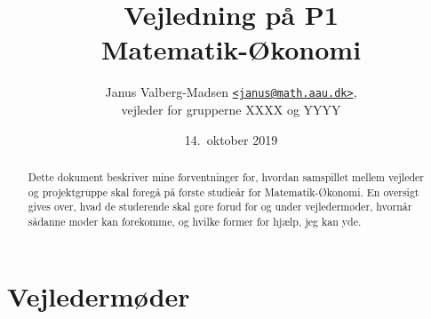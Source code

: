 \documentclass[12pt,a4paper,oneside,final]{article}
\title{
  Vejledning på P1\\
  Matematik-{\O}konomi
}
\author{
  Janus Valberg-Madsen \href{mailto:janus@math.aau.dk}{\texttt{<janus@math.aau.dk>}},\\
  vejleder for grupperne XXXX og YYYY
}
\date{14.\ oktober 2019}
\begin{document}
\maketitle

\renewcommand{\abstractname}{Om dette dokument}
\begin{abstract}
  Dette dokument beskriver mine forventninger for, hvordan samspillet mellem vejleder og projektgruppe skal foregå på første studieår for Matematik-Økonomi.
  En oversigt gives over, hvad de studerende skal gøre forud for og under vejledermøder, hvornår sådanne møder kan forekomme, og hvilke former for hjælp, jeg kan yde.
\end{abstract}


\section{Vejledermøder}
\end{document}
